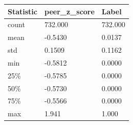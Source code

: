 \begin{tabular}{lll}
\toprule
Statistic & peer\_z\_score & Label \\
\midrule
count & 732.000 & 732.000 \\
mean & -0.5430 & 0.0137 \\
std & 0.1509 & 0.1162 \\
min & -0.5812 & 0.0000 \\
25\% & -0.5785 & 0.0000 \\
50\% & -0.5730 & 0.0000 \\
75\% & -0.5566 & 0.0000 \\
max & 1.941 & 1.000 \\
\bottomrule
\end{tabular}